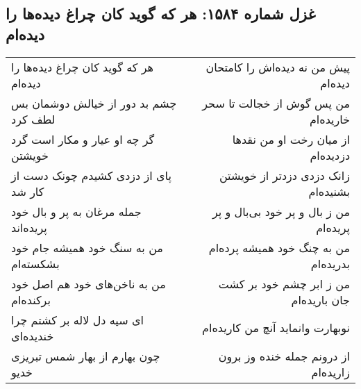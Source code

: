 \begin{center}
\section*{غزل شماره ۱۵۸۴: هر که گوید کان چراغ دیده‌ها را دیده‌ام}
\label{sec:1584}
\begin{longtable}{l p{0.5cm} r}
هر که گوید کان چراغ دیده‌ها را دیده‌ام
&&
پیش من نه دیده‌اش را کامتحان دیده‌ام
\\
چشم بد دور از خیالش دوشمان بس لطف کرد
&&
من پس گوش از خجالت تا سحر خاریده‌ام
\\
گر چه او عیار و مکار است گرد خویشتن
&&
از میان رخت او من نقدها دزدیده‌ام
\\
پای از دزدی کشیدم چونک دست از کار شد
&&
زانک دزدی دزدتر از خویشتن بشنیده‌ام
\\
جمله مرغان به پر و بال خود پریده‌اند
&&
من ز بال و پر خود بی‌بال و پر پریده‌ام
\\
من به سنگ خود همیشه جام خود بشکسته‌ام
&&
من به چنگ خود همیشه پرده‌ام بدریده‌ام
\\
من به ناخن‌های خود هم اصل خود برکنده‌ام
&&
من ز ابر چشم خود بر کشت جان باریده‌ام
\\
ای سیه دل لاله بر کشتم چرا خندیده‌ای
&&
نوبهارت وانماید آنچ من کاریده‌ام
\\
چون بهارم از بهار شمس تبریزی خدیو
&&
از درونم جمله خنده وز برون زاریده‌ام
\\
\end{longtable}
\end{center}
